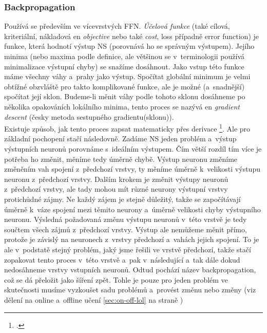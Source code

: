 \documentclass[12pt,oneside]{report}			%
\newcommand{\doubleref}[1]{\ref{#1} na straně \pageref{#1}}
\begin{document}
	\subsubsection{Backpropagation}
	\label{sec:BP}
	Používá se především ve vícevrstvých \gls{FFN}. \emph{Účelová funkce} (také cílová, kriteriální, nákladová \gls{en} \emph{objective} nebo také \emph{cost}, loss případně error function) \parencite[\gls{s} 77]{NN_introduction-Kriessel} \parencite[\gls{s} 733]{AIAMA} \parencite{wiki:ucelova-funkce} \parencite[\gls{k} 1.5]{NN-Nielsen-web} je funkce, která hodnotí výstup \gls{NS} (porovnává ho se správným výstupem). Jejího minima (nebo maxima podle definice, ale většinou se v~terminologii  používá minimalizace výstupní chyby) se snažíme dosáhnout. Jako vstup této funkce máme všechny váhy a~prahy jako výstup. Spočítat globální minimum je velmi obtížné obzvláště pro takto komplikované funkce, ale je možné (a~snadnější) spočítat její sklon. Budeme-li měnit váhy podle tohoto sklonu dosáhneme po několika opakováních lokálního minima, tento proces se nazývá \gls{en} \emph{gradient descent} (česky metoda sestupného gradientu(sklonu)).\parencite{3B1B-ch2}\\
	Existuje způsob, jak tento proces zapsat matematicky přes derivace \footcite[Anglicky s~pěkným grafickým znázorněním to popisuje Backpropagation calculus | Deep learning, chapter 4 od 3Blue1Brown na stránce YouTube]{3B1B-ch4}. Ale pro základní pochopení stačí následovně. Zadáme \gls{NS} jeden problém a~výstup výstupních neuronů porovnáme s~ideálním výstupem. Čím větší rozdíl tím více je potřeba ho změnit, měníme tedy úměrně chybě. Výstup neuronu změníme změněním vah spojení z~předchozí vrstvy, ty měníme úměrně k~velikosti výstupu neuronu z~předchozí vrstvy. Dalším krokem je změnit výstupy neuronů z~předchozí vrstvy, ale tady mohou mít různé neurony výstupní vrstvy protichůdné zájmy. Ne každý zájem je stejně důležitý, takže se započítávají úměrně k~váze spojení mezi těmito neurony a~úměrně velikosti chyby výstupního neuronu. Výsledná požadovaná změnu výstupu neuronů v~této vrstvě je tedy součtem všech zájmů z~předchozí vrstvy. Výstup ale nemůžeme měnit přímo, protože je závislý na neuronech z~vrstvy předchozí a~vahách jejich spojení. To je ale v~podstatě stejný problém, jaký jsme řešili ve vrstvě předchozí, takže stačí zopakovat tento proces v~této vrstvě a~pak v~následující a~tak dále dokud nedosáhneme vrstvy vstupních neuronů. Odtud pochází název backpropagation, což se dá přeložit jako šíření zpět. Tohle je pouze pro jeden problém ve skutečnosti musíme vyzkoušet sadu problémů  a~provést změnu nebo změny (\gls{viz} dělení na online a~offline učení \doubleref{sec:on-off-lol}) \parencite{3B1B-ch3}
	
\end{document}
